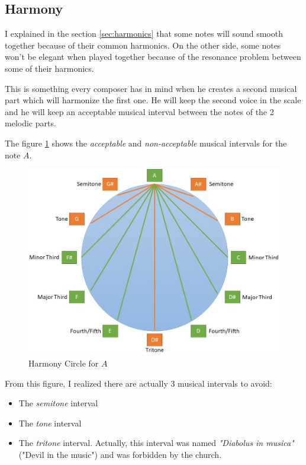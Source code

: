 \documentclass[12pt]{report}
\begin{document}
\subsection{Harmony}
\label{sec:harmony}

I explained in the section \ref{sec:harmonics} that some notes will sound smooth together because of their common harmonics.
On the other side, some notes won't be elegant when played together because of the resonance problem between some of their harmonics.

This is something every composer has in mind when he creates a second musical part which will harmonize the first one.
He will keep the second voice in the scale and he will keep an acceptable musical interval between the notes of the 2 melodic parts.

The figure \ref{fig:harmony_circle} shows the \textit{acceptable} and \textit{non-acceptable} musical intervals for the note $A$.

\begin{figure}[ht]
    \centering
    \includegraphics[width=\textwidth]{images/music/circle_harmony.jpg}
    \caption{Harmony Circle for $A$}
    \label{fig:harmony_circle}
\end{figure}

From this figure, I realized there are actually 3 musical intervals to avoid:
\begin{itemize}
    \item The \textit{semitone} interval
    \item The \textit{tone} interval
    \item The \textit{tritone} interval. Actually, this interval was named \textit{"Diabolus in musica"} ("Devil in the music") and was forbidden by the church.
\end{itemize}
\end{document}
